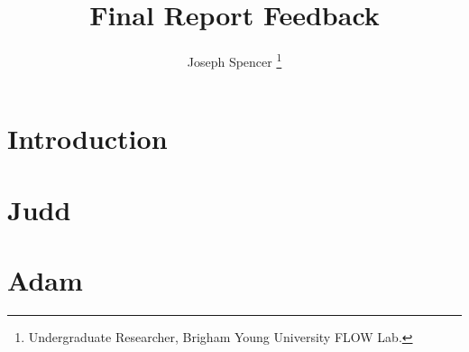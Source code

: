 \documentclass[journal ]{new-aiaa}
\title{Final Report Feedback}
\author{Joseph Spencer \footnote{Undergraduate Researcher, Brigham Young University FLOW Lab.}}
\affil{Brigham Young University, Provo, Utah, 84601}
\begin{document}
\maketitle


\section{Introduction}

\section{Judd}

\section{Adam}




\end{document}
